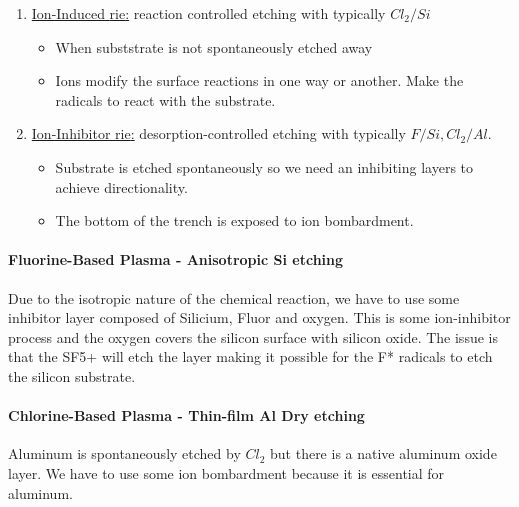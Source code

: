 \documentclass[
]{article}
\begin{document}
\begin{enumerate}
\def\labelenumi{\arabic{enumi}.}
\item
  \ul{Ion-Induced {rie}:} reaction controlled etching with typically
  \(Cl_2/Si\)

  \begin{itemize}
  \item
    When subststrate is not spontaneously etched away
  \item
    Ions modify the surface reactions in one way or another. Make the
    radicals to react with the substrate.
  \end{itemize}
\item
  \ul{Ion-Inhibitor {rie}:} desorption-controlled etching with typically
  \(F/Si, Cl_2/Al\).

  \begin{itemize}
  \item
    Substrate is etched spontaneously so we need an inhibiting layers to
    achieve directionality.
  \item
    The bottom of the trench is exposed to ion bombardment.
  \end{itemize}
\end{enumerate}

\hypertarget{fluorine-based-plasma---anisotropic-si-etching}{%
\paragraph{Fluorine-Based Plasma - Anisotropic Si
etching}\label{fluorine-based-plasma---anisotropic-si-etching}}

Due to the isotropic nature of the chemical reaction, we have to use
some inhibitor layer composed of Silicium, Fluor and oxygen. This is
some ion-inhibitor process and the oxygen covers the silicon surface
with silicon oxide. The issue is that the SF5+ will etch the layer
making it possible for the F* radicals to etch the silicon substrate.

\hypertarget{chlorine-based-plasma---thin-film-al-dry-etching}{%
\paragraph{Chlorine-Based Plasma - Thin-film Al Dry
etching}\label{chlorine-based-plasma---thin-film-al-dry-etching}}

Aluminum is spontaneously etched by \(Cl_2\) but there is a native
aluminum oxide layer. We have to use some ion bombardment because it is
essential for aluminum.
\end{document}
